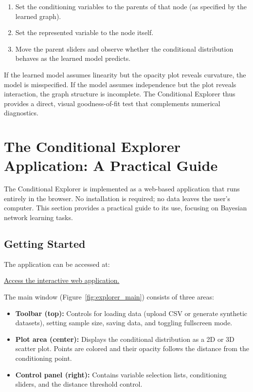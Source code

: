 \begin{enumerate}
    \item Set the conditioning variables to the parents of that node (as specified by the learned graph).
    \item Set the represented variable to the node itself.
    \item Move the parent sliders and observe whether the conditional distribution behaves as the learned model predicts.
\end{enumerate}

If the learned model assumes linearity but the opacity plot reveals curvature, the model is misspecified. If the model assumes independence but the plot reveals interaction, the graph structure is incomplete. The Conditional Explorer thus provides a direct, visual goodness-of-fit test that complements numerical diagnostics.

\section{The Conditional Explorer Application: A Practical Guide}

The Conditional Explorer is implemented as a web-based application that runs entirely in the browser. No installation is required; no data leaves the user's computer. This section provides a practical guide to its use, focusing on Bayesian network learning tasks.

\subsection{Getting Started}

The application can be accessed at:
\begin{center}
    \href{https://enriquecastilloron.github.io/mi-libro-interactivo/apps/ConditionalExplorerFINAL.html}
    {\textcolor{accentblue}{Access the interactive web application.}}
\end{center}

The main window (Figure~\ref{fig:explorer_main}) consists of three areas:

\begin{itemize}
    \item \textbf{Toolbar (top):} Controls for loading data (upload CSV or generate synthetic datasets), setting sample size, saving data, and toggling fullscreen mode.
    \item \textbf{Plot area (center):} Displays the conditional distribution as a 2D or 3D scatter plot. Points are colored and their opacity follows the distance from the conditioning point.
    \item \textbf{Control panel (right):} Contains variable selection lists, conditioning sliders, and the distance threshold control.
\end{itemize}

